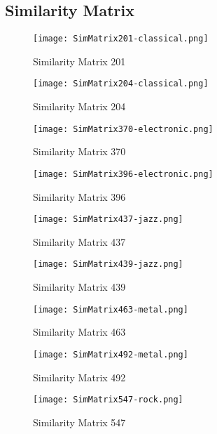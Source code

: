 \documentclass{article} %
\begin{document}

\subsection{Similarity Matrix}
\label{sec:Sim}


\begin{figure}[H]
\centering
\texttt{[image: SimMatrix201-classical.png]}
\caption{Similarity Matrix 201}
\label{fig:sim201_1}
\end{figure}

\begin{figure}[H]
\centering
\texttt{[image: SimMatrix204-classical.png]}
\caption{Similarity Matrix 204}
\label{fig:sim204_1}
\end{figure}


\begin{figure}[H]
\centering
\texttt{[image: SimMatrix370-electronic.png]}
\caption{Similarity Matrix 370}
\label{fig:sim370_1}
\end{figure}

\begin{figure}[H]
\centering
\texttt{[image: SimMatrix396-electronic.png]}
\caption{Similarity Matrix 396}
\label{fig:sim396_1}
\end{figure}

\begin{figure}[H]
\centering
\texttt{[image: SimMatrix437-jazz.png]}
\caption{Similarity Matrix 437}
\label{fig:sim437_1}
\end{figure}

\begin{figure}[H]
\centering
\texttt{[image: SimMatrix439-jazz.png]}
\caption{Similarity Matrix 439}
\label{fig:sim439_1}
\end{figure}

\begin{figure}[H]
\centering
\texttt{[image: SimMatrix463-metal.png]}
\caption{Similarity Matrix 463}
\label{fig:sim463_1}
\end{figure}

\begin{figure}[H]
\centering
\texttt{[image: SimMatrix492-metal.png]}
\caption{Similarity Matrix 492}
\label{fig:sim492_1}
\end{figure}

\begin{figure}[H]
\centering
\texttt{[image: SimMatrix547-rock.png]}
\caption{Similarity Matrix 547}
\label{fig:sim547_1}
\end{figure}
\end{document}
